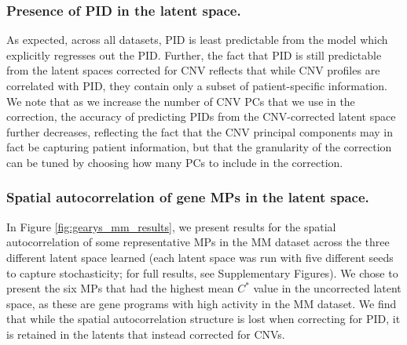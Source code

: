\documentclass{article}
\begin{document}


\subsubsection{Presence of PID in the latent space.}
As expected, across all datasets, PID is least predictable from the model which explicitly regresses out the PID. Further, the fact that PID is still predictable from the latent spaces corrected for CNV reflects that while CNV profiles are correlated with PID, they contain only a subset of patient-specific information. We note that as we increase the number of CNV PCs that we use in the correction, the accuracy of predicting PIDs from the CNV-corrected latent space further decreases, reflecting the fact that the CNV principal components may in fact be capturing patient information, but that the granularity of the correction can be tuned by choosing how many PCs to include in the correction.

\subsubsection{Spatial autocorrelation of gene MPs in the latent space.}
In Figure \ref{fig:gearys_mm_results}, we present results for the spatial autocorrelation of some representative MPs in the MM dataset across the three different latent space learned (each latent space was run with five different seeds to capture stochasticity; for full results, see Supplementary Figures). We chose to present the six MPs that had the highest mean $C^*$ value in the uncorrected latent space, as these are gene programs with high activity in the MM dataset. We find that while the spatial autocorrelation structure is lost when correcting for PID, it is retained in the latents that instead corrected for CNVs.
\end{document}

